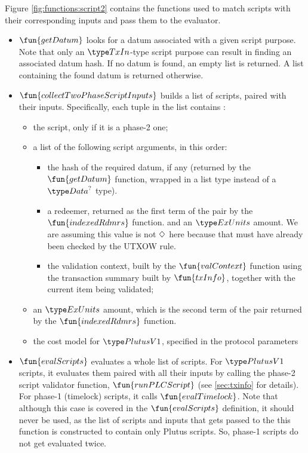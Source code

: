 Figure \ref{fig:functions:script2} contains the functions used to
match scripts with their corresponding inputs and pass them to the
evaluator.

\begin{itemize}
  \item $\fun{getDatum}$ looks for a datum associated with a given script purpose. Note that
  only an $\TxIn$-type script purpose can result in finding an associated datum hash.
  If no datum is found, an empty list is returned. A list containing the found datum
  is returned otherwise.

  \item $\fun{collectTwoPhaseScriptInputs}$ builds a list of scripts, paired with their
  inputs. Specifically, each tuple in the list contains :

  \begin{itemize}
  \item the script, only if it is a phase-2 one;

  \item a list of the following script arguments, in this order:

  \begin{itemize}
    \item the hash of the required datum, if any (returned by the $\fun{getDatum}$ function,
    wrapped in a list type instead of a $\Data^?$ type).

    \item a redeemer, returned as the first term of the pair by the $\fun{indexedRdmrs}$ function.
    and an $\ExUnits$ amount. We are assuming this value is not $\Diamond$ here
    because that must have already been checked by the UTXOW rule.

    \item the validation context, built by the $\fun{valContext}$ function using
    the transaction summary built by $\fun{txInfo}$, together with the current item being validated;
  \end{itemize}

  \item an $\ExUnits$ amount, which is the second term of the pair returned by the $\fun{indexedRdmrs}$ function.

  \item the cost model for $\PlutusVI$, specified in the protocol parameters
  \end{itemize}

  \item $\fun{evalScripts}$ evaluates a whole list of scripts. For $\PlutusVI$ scripts,
  it evaluates them paired with all their
  inputs by calling the phase-2 script validator function, $\fun{runPLCScript}$ (see
  \ref{sec:txinfo} for details).
  For phase-1 (timelock) scripts, it calls $\fun{evalTimelock}$. Note that although this
  case is covered in the $\fun{evalScripts}$ definition, it should never be used, as
  the list of scripts and inputs that gets passed to the this function is constructed
  to contain only Plutus scripts. So, phase-1 scripts do not get evaluated twice.
\end{itemize}

